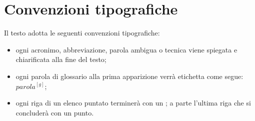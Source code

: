 \section{Convenzioni tipografiche}
Il testo adotta le seguenti convenzioni tipografiche:
\begin{itemize}
	\item ogni acronimo, abbreviazione, parola ambigua o tecnica viene spiegata e chiarificata alla fine del testo;
	\item ogni parola di glossario alla prima apparizione verrà etichetta come segue: $parola^{[g]}$;
	\item ogni riga di un elenco puntato terminerà con un ; a parte l'ultima riga che si concluderà con un punto.
\end{itemize}



































